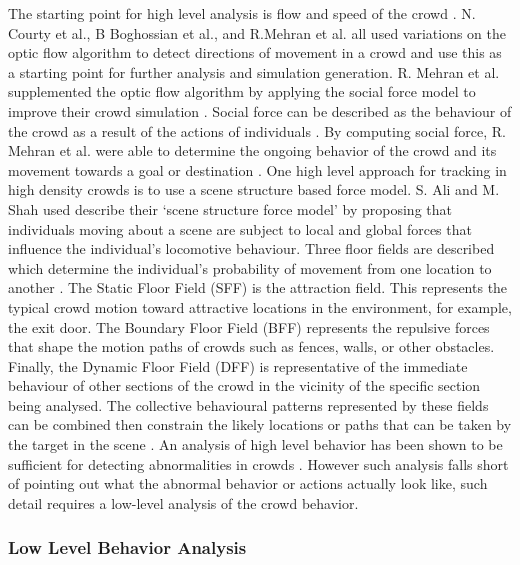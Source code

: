 \documentclass[12pt, onecolumn, conference]{IEEEtran}
\begin{document}
The starting point for high level analysis is flow and speed of the crowd \cite{N. Courty}\cite{B. Boghossian}\cite{R. Mehran}. N. Courty et al., B Boghossian et al., and R.Mehran et al. all used variations on the optic flow algorithm to detect directions of movement in a crowd and use this as a starting point for further analysis and simulation generation. R. Mehran et al. supplemented the optic flow algorithm by applying the social force model to improve their crowd simulation \cite{R. Mehran}. Social force can be described as the behaviour of the crowd as a result of the actions of individuals \cite{R. Mehran}. By computing social force, R. Mehran et al. were able to determine the ongoing behavior of the crowd and its movement towards a goal or destination \cite{R. Mehran}. 
One high level approach for tracking in high density crowds is to use a scene structure based force model\cite{S. Ali}. S. Ali and M. Shah used describe their ‘scene structure force model’ by proposing that individuals moving about a scene are subject to local and global forces that influence the individual’s locomotive behaviour. Three floor fields are described which determine the individual’s probability of movement from one location to another \cite{S. Ali}. The Static Floor Field (SFF) is the attraction field. This represents the typical crowd motion toward attractive locations in the environment, for example, the exit door. The Boundary Floor Field (BFF) represents the repulsive forces that shape the motion paths of crowds such as fences, walls, or other obstacles. Finally, the Dynamic Floor Field (DFF) is representative of the immediate behaviour of other sections of the crowd in the vicinity of the specific section being analysed. The collective behavioural patterns represented by these fields can be combined then constrain the likely locations or paths that can be taken by the target in the scene \cite{S. Ali}. 
An analysis of high level behavior has been shown to be sufficient for detecting abnormalities in crowds \cite{R. Mehran}\cite{F. Zhao}. However such analysis falls short of pointing out what the abnormal behavior or actions actually look like, such detail requires a low-level analysis of the crowd behavior.

\subsubsection{Low Level Behavior Analysis}
\end{document}
